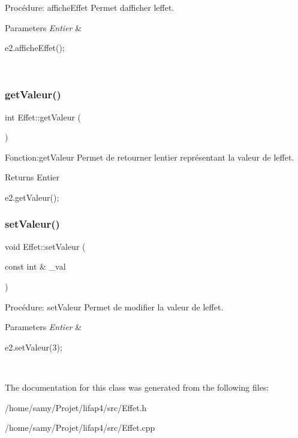 Procédure\+: affiche\+Effet Permet d\textquotesingle{}afficher l\textquotesingle{}effet. 


\begin{DoxyParams}{Parameters}
{\em Entier} & 
\begin{DoxyCode}
e2.afficheEffet();
\end{DoxyCode}
 \\
\hline
\end{DoxyParams}
\mbox{\label{classEffet_ab47e7ca4baed53d6955ad59a41d79538}} 
\subsubsection{\texorpdfstring{get\+Valeur()}{getValeur()}}
{\footnotesize\ttfamily int Effet\+::get\+Valeur (\begin{DoxyParamCaption}{ }\end{DoxyParamCaption})}



Fonction\+:get\+Valeur Permet de retourner l\textquotesingle{}entier représentant la valeur de l\textquotesingle{}effet. 

\begin{DoxyReturn}{Returns}
Entier 
\begin{DoxyCode}
e2.getValeur();
\end{DoxyCode}
 
\end{DoxyReturn}
\mbox{\label{classEffet_a3d22eeba4c86d9f45e75d64e639d4e37}} 
\subsubsection{\texorpdfstring{set\+Valeur()}{setValeur()}}
{\footnotesize\ttfamily void Effet\+::set\+Valeur (\begin{DoxyParamCaption}\item[{const int \&}]{\+\_\+val }\end{DoxyParamCaption})}



Procédure\+: set\+Valeur Permet de modifier la valeur de l\textquotesingle{}effet. 


\begin{DoxyParams}{Parameters}
{\em Entier} & 
\begin{DoxyCode}
e2.setValeur(3);
\end{DoxyCode}
 \\
\hline
\end{DoxyParams}


The documentation for this class was generated from the following files\+:\begin{DoxyCompactItemize}
\item 
/home/samy/\+Projet/lifap4/src/Effet.\+h\item 
/home/samy/\+Projet/lifap4/src/Effet.\+cpp\end{DoxyCompactItemize}

